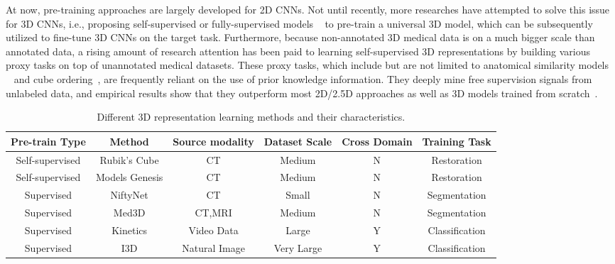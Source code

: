 \documentclass[journal,twoside,web]{ieeecolor}
\begin{document}
At now, pre-training approaches are largely developed for 2D CNNs. Not until recently, more researches have attempted to solve this issue for 3D CNNs, i.e., proposing self-supervised or fully-supervised models ~\cite{zhou2020models,zhu2020rubik,gibson2018niftynet,chen2019med3d} to pre-train a universal 3D model, which can be subsequently utilized to fine-tune 3D CNNs on the target task. Furthermore, because non-annotated 3D medical data is on a much bigger scale than annotated data, a rising amount of research attention has been paid to learning self-supervised 3D representations by building various proxy tasks on top of unannotated medical datasets. These proxy tasks, which include but are not limited to anatomical similarity models ~\cite{zhou2020models} and cube ordering~\cite{zhu2020rubik}, are frequently reliant on the use of prior knowledge information. They deeply mine free supervision signals from unlabeled data, and empirical results show that they outperform most 2D/2.5D approaches as well as 3D models trained from scratch~\cite{li2019mvp,ni2019elastic}.

\begin{table*}[!tbp]
    \centering
    \setlength{\belowcaptionskip}{5pt}
    \caption{Different 3D representation learning methods and their characteristics.}
    \label{Datasets}
\begin{tabular}{cccccc} \hline
        Pre-train Type & Method & Source modality & Dataset Scale & Cross Domain & Training Task  \\ \hline
        Self-supervised & Rubik's Cube & CT &  Medium & N & Restoration\\ 
        Self-supervised & Models Genesis  & CT & Medium & N & Restoration \\ \hline
        Supervised & NiftyNet & CT &   Small & N & Segmentation \\ 
        Supervised & Med3D & CT,MRI &   Medium & N & Segmentation \\ \hline
Supervised & Kinetics & Video Data &  Large & Y & Classification \\  
        Supervised & I3D      & Natural Image &  Very Large & Y &  Classification \\  \hline
    \end{tabular}
\end{table*}
\end{document}
